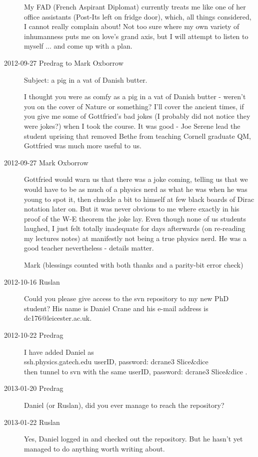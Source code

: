 \begin{description}
My FAD (French Aspirant Diplomat) currently treats me like one of her
office assistants (Post-Its left on fridge door), which, all things
considered, I cannot really complain about!
Not too sure where my own variety of
inhumanness puts me on love's grand axis, but I will attempt to listen to
myself ... and come up with a plan.

\item[2012-09-27 Predrag
to Mark Oxborrow]
Subject: a pig in a vat of Danish butter.

I thought you were as comfy as a pig in a vat of Danish butter - weren't
you on the cover of Nature or something? I'll cover the ancient times,
if you give me some of Gottfried's bad jokes (I probably did not notice
they were jokes?) when I took the course. It was good - Joe Serene lead
the student uprising that removed Bethe from teaching Cornell graduate QM,
Gottfried was much more useful to us.

\item[2012-09-27 Mark Oxborrow]
Gottfried would warn us that there was a joke coming, telling us that we
would have to be as much of a physics nerd as what he was when he was
young to spot it, then chuckle a bit to himself at few black boards of
Dirac notation later on. But it was never obvious to me where exactly in
his proof of the W-E theorem the joke lay. Even though none of us
students laughed, I just felt totally inadequate for days afterwards (on
re-reading my lectures notes) at manifestly not being a true physics
nerd. He was a good teacher nevertheless - details matter.

Mark (blessings counted with both thanks and a parity-bit error check)


\item[2012-10-16 Ruslan] Could you please give access to the svn
repository to my new PhD student?  His name is Daniel Crane and his
e-mail address is dc176@leicester.ac.uk.

\item[2012-10-22 Predrag] I have added Daniel as
\\
ssh.physics.gatech.edu userID, password: dcrane3 	Slice{\&}dice
\\
then
{tunnel to svn} with the same userID,   password:
dcrane3           Slice{\&}dice .

\item[2013-01-20 Predrag] Daniel (or Ruslan), did you ever manage to reach the repository?
\item[2013-01-22 Ruslan] Yes, Daniel logged in and checked out the repository.  But he hasn't yet managed to do anything worth writing about.


\end{description}
